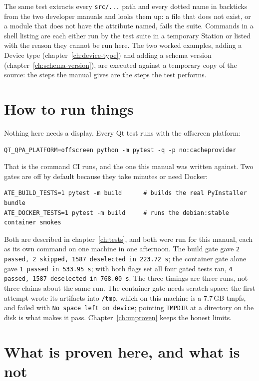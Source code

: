 The same test extracts every \texttt{src/...} path and every dotted name in backticks from the two
developer manuals and looks them up: a file that does not exist, or a module that does not have the
attribute named, fails the suite. Commands in a shell listing are each either run by the test suite in
a temporary Station or listed with the reason they cannot be run here. The two worked examples,
adding a Device type (chapter~\ref{ch:device-type}) and adding a schema version
(chapter~\ref{ch:schema-version}), are executed against a temporary copy of the source: the steps the
manual gives are the steps the test performs.

\section{How to run things}

Nothing here needs a display. Every Qt test runs with the offscreen platform:

\begin{lstlisting}[language=ATEShell]
QT_QPA_PLATFORM=offscreen python -m pytest -q -p no:cacheprovider
\end{lstlisting}

That is the command CI runs, and the one this manual was written against. Two gates are off by
default because they take minutes or need Docker:

\begin{lstlisting}[language=ATEShell]
ATE_BUILD_TESTS=1 pytest -m build      # builds the real PyInstaller bundle
ATE_DOCKER_TESTS=1 pytest -m build     # runs the debian:stable container smokes
\end{lstlisting}

Both are described in chapter~\ref{ch:tests}, and both were run for this manual, each as its own command
on one machine in one afternoon. The build gate gave \texttt{2 passed, 2 skipped, 1587 deselected in
223.72 s}; the container gate alone gave \texttt{1 passed in 533.95 s}; with both flags set all four
gated tests ran, \texttt{4 passed, 1587 deselected in 768.00 s}. The three timings are three runs, not
three claims about the same run. The container gate needs scratch space: the
first attempt wrote its artifacts into \texttt{/tmp}, which on this machine is a 7.7\,GB tmpfs, and
failed with \texttt{No space left on device}; pointing \texttt{TMPDIR} at a directory on the disk is
what makes it pass. Chapter~\ref{ch:unproven} keeps the honest limits.

\section{What is proven here, and what is not}

